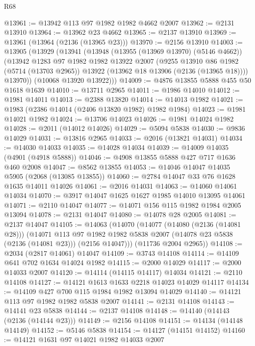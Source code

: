 \begin{lexlean}{R68}
\begin{coremodule}
@13961 := @13942 @113 @97 @1982 @1982 @4662 @2007
@13962 := @2131 @13910
@13964 := @13962 @23 @4662
@13965 := @2137 @13910
@13969 := @13961 (@13964 (@2136 (@13965 @23)))
@13970 := @2156 @13910
@14003 := @13905
    (@13929
      (@13941
        (@13948
          (@13955 (@13969 @13970) (@5146 @4662))
          (@13942
            @1283
            @97
            @1982
            @1982
            @13922
            @2007
            (@9255
              @13910
              @86
              @1982
              (@5714 (@13703 @2965))
              @13922
              (@13962 @18 @13906 (@2136 (@13965 @18))))
            @13970))
        (@10068 @13920 @13922)))
@14009 := @4876 @13855 @5888 @455 @50 @1618 @1639
@14010 := @13711 @2965
@14011 := @1986 @14010
@14012 := @1981 @14011
@14013 := @2388 @13820
@14014 := @14013 @1982
@14021 := @1983 (@2386 @14014 (@2406 @13820 @1982) @1982 @1984)
@14023 := @1981 @14021 @1982
@14024 := @13706 @14023
@14026 := @1981 @14024 @1982
@14028 := @2011 (@14012 @14026)
@14029 := @5094 @5838
@14030 := @9836 @14029
@14031 := @13816 @2965
@14033 := @2016 (@13821 @14031)
@14034 := @14030 @14033
@14035 := @14028 @14034
@14039 := @14009 @14035 (@4901 (@4918 @5888))
@14046 := @4908 @13855 @5888 @427 @717 @1636 @460 @2008
@14047 := @8562 @13855
@14053 := @14046 @14047 @14035 @5905 (@2068 (@13085 @13855))
@14060 := @2784 @14047 @33 @76 @1628 @1635 @14011 @14026
@14061 := @2016 @14031
@14063 := @14060 @14061 @14034
@14070 := @3917 @14047 @1625 @1627 @1985 @14010 @13095 @14061
@14071 := @2110 @14047
@14077 := @14071 @156 @115 @1982 @1984 @2005 @13094
@14078 := @2131 @14047
@14080 := @14078 @28 @2005
@14081 := @2137 @14047
@14105 := @14063
    (@14070
      (@14077
        (@14080 (@2136 (@14081 @28)))
        (@14071
          @113
          @97
          @1982
          @1982
          @5838
          @2007
          (@14078 @23 @5838 (@2136 (@14081 @23)))
          (@2156 @14047)))
      (@11736 @2004 @2965))
@14108 := @2034 (@2817 @14061) @14047
@14109 := @3743 @14108
@14114 := @14109 @641 @702 @1634 @14024 @1982
@14115 := @2000 @14029
@14117 := @2000 @14033 @2007
@14120 := @14114 (@14115 @14117) @14034
@14121 := @2110 @14108
@14127 := @14121 @1613 @1633 @2218 @14023 @14029 @14117
@14134 := @14109 @427 @700 @115 @1984 @1982 @13094 @14029
@14140 := @14121 @113 @97 @1982 @1982 @5838 @2007
@14141 := @2131 @14108
@14143 := @14141 @23 @5838
@14144 := @2137 @14108
@14148 := @14140 (@14143 (@2136 (@14144 @23)))
@14149 := @2156 @14108
@14151 := @14134 (@14148 @14149)
@14152 := @5146 @5838
@14154 := @14127 (@14151 @14152)
@14160 := @14121 @1631 @97 @14021 @1982 @14033 @2007

\end{coremodule}
\end{lexlean}
